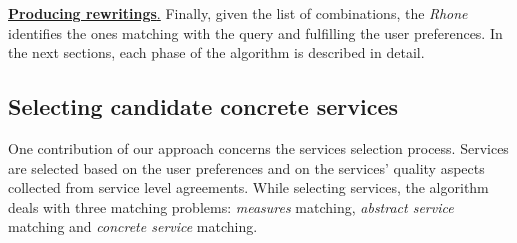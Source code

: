 \noindent \underline{\textbf{Producing rewritings}.} Finally, given the list of combinations, the \textit{Rhone} identifies the ones matching with the query and fulfilling the user preferences.
In the next sections, each phase of the algorithm is described in detail. 

\subsection{Selecting candidate concrete services}

One contribution of our approach concerns the services selection process. Services are selected based on the user preferences and on the services' quality aspects collected from service level agreements.
While selecting services, the algorithm deals with three matching problems: \textit{measures} matching, \textit{abstract service} matching and \textit{concrete service} matching.


